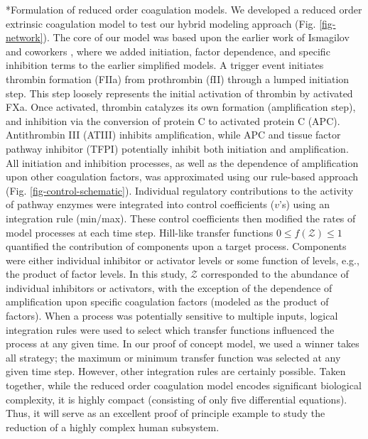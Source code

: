 \documentclass[12pt]{article}
\makeatletter
\renewcommand\subsection{\@startsection
	{subsection}{2}{0mm}
	{-0.05in}
	{-0.5\baselineskip}
	{\normalfont\normalsize\bfseries}}
\makeatother
\begin{document}

\subsection*{Formulation of reduced order coagulation models.}
We developed a reduced order extrinsic coagulation model to test our hybrid modeling approach (Fig. \ref{fig-network}).
The core of our model was based upon the earlier work of Ismagilov and coworkers \citep{Runyon:2004aa,Kastrup:2006aa,Runyon:2007aa,Runyon:2008aa}, 
where we added initiation, factor dependence, and specific inhibition terms to the earlier simplified models.
A trigger event initiates thrombin formation (FIIa) from prothrombin (fII) through a lumped initiation step.
This step loosely represents the initial activation of thrombin by activated FXa.
Once activated, thrombin catalyzes its own formation (amplification step), and inhibition via the conversion of protein C to activated protein C (APC).
Antithrombin III (ATIII) inhibits amplification, while APC and tissue factor pathway inhibitor (TFPI) potentially inhibit both initiation and amplification. 
All initiation and inhibition processes, as well as the dependence of amplification upon other coagulation factors, was approximated using our rule-based approach (Fig. \ref{fig-control-schematic}). 
Individual regulatory contributions to the activity of pathway enzymes were integrated into control coefficients ($v$'s) using an integration rule (min/max).  
These control coefficients then modified the rates of model processes at each time step.
Hill-like transfer functions $0 \leq f\left(\mathcal{Z}\right) \leq 1$ quantified the contribution of components upon a target process. 
Components were either individual inhibitor or activator levels or some function of levels, e.g., the product of factor levels. 
In this study, $\mathcal{Z}$ corresponded to the abundance of individual inhibitors or activators, 
with the exception of the dependence of amplification upon specific coagulation factors (modeled as the product of factors). 
When a process was potentially sensitive to multiple inputs, logical integration rules were used to select which transfer functions influenced the process at any given time. 
In our proof of concept model, we used a winner takes all strategy; the maximum or minimum transfer function was selected at any given time step. 
However, other integration rules are certainly possible. 
Taken together, while the reduced order coagulation model encodes significant biological complexity, it is highly compact (consisting of only five differential equations). 
Thus, it will serve as an excellent proof of principle example to study the reduction of a highly complex human subsystem.  
\end{document}
